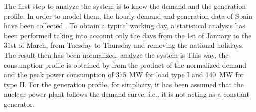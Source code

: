The first step to analyze the system is to know the demand and the generation profile. In order to model them, the hourly demand and generation data of Spain have been collected \cite{esios}. To obtain a typical working day, a statistical analysis has been performed taking into account only the days from the 1st of January to the 31st of March, from Tuesday to Thursday and removing the national holidays. The result then has been normalized. analyze the system is This way, the consumption profile is obtained by from the product of the normalized demand and the peak power consumption of 375~MW for load type I and 140~MW for type II. For the generation profile, for simplicity, it has been assumed that the nuclear power plant follows the demand curve, i.e., it is not acting as a constant generator.




